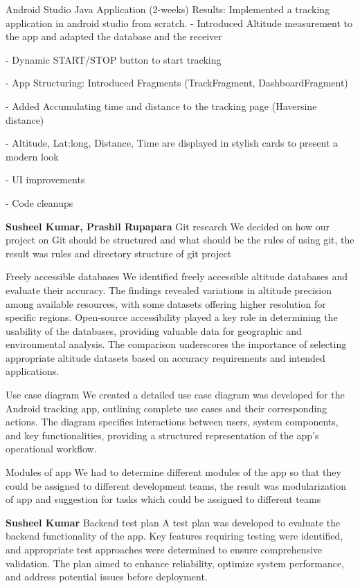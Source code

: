 \documentclass[12pt]{article}
\begin{document}
Android Studio Java Application (2-weeks) 
Results: Implemented a tracking application in android studio from scratch. 
- Introduced Altitude measurement to the app and adapted the database and the receiver 

- Dynamic START/STOP button to start tracking 

- App Structuring: Introduced Fragments (TrackFragment, DashboardFragment) 

- Added Accumulating time and distance to the tracking page (Haversine distance) 

- Altitude, Lat:long, Distance, Time are displayed in stylish cards to present a modern look 

- UI improvements 

- Code cleanups

{\large\textbf{Susheel Kumar, Prashil Rupapara}}
Git research
We decided on how our project on Git should be structured and what should be the rules of using git, the result was rules and directory structure of git project

Freely accessible databases
We identified freely accessible altitude databases and evaluate their accuracy. The findings revealed variations in altitude precision among available resources, with some datasets offering higher resolution for specific regions. Open-source accessibility played a key role in determining the usability of the databases, providing valuable data for geographic and environmental analysis. The comparison underscores the importance of selecting appropriate altitude datasets based on accuracy requirements and intended applications.

Use case diagram
We created a detailed use case diagram was developed for the Android tracking app, outlining complete use cases and their corresponding actions. The diagram specifies interactions between users, system components, and key functionalities, providing a structured representation of the app’s operational workflow.

Modules of app
We had to determine different modules of the app so that they could be assigned to different development teams, the result was modularization of app and suggestion for tasks which could be assigned to different teams

{\large\textbf{Susheel Kumar}}
Backend test plan
A test plan was developed to evaluate the backend functionality of the app. Key features requiring testing were identified, and appropriate test approaches were determined to ensure comprehensive validation. The plan aimed to enhance reliability, optimize system performance, and address potential issues before deployment.
\end{document}
